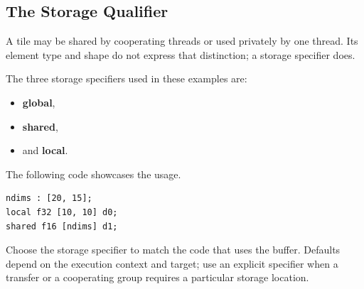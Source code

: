 \subsection*{The Storage Qualifier}

A tile may be shared by cooperating threads or used privately by one thread. Its element type and shape do not express that distinction; a storage specifier does.

The three storage specifiers used in these examples are:

\begin{itemize}[leftmargin=1.6em]
\item \textbf{global},
\item \textbf{shared},
\item and \textbf{local}.
\end{itemize}

The following code showcases the usage.

\begin{lstlisting}[language=croqtile,caption={The Storage Qualifier}]
ndims : [20, 15];
local f32 [10, 10] d0;
shared f16 [ndims] d1;
\end{lstlisting}

Choose the storage specifier to match the code that uses the buffer. Defaults depend on the execution context and target; use an explicit specifier when a transfer or a cooperating group requires a particular storage location.
